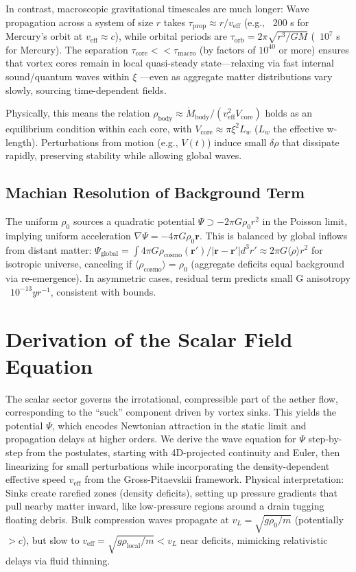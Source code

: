 \documentclass{article}
\begin{document}
In contrast, macroscopic gravitational timescales are much longer: Wave propagation across a system of size $r$ takes $\tau_{\text{prop}} \approx r / v_{\text{eff}}$ (e.g., ~200 s for Mercury's orbit at $v_{\text{eff}} \approx c$), while orbital periods are $\tau_{\text{orb}} = 2\pi \sqrt{r^3 / G M}$ (~$10^{7}$ s for Mercury). The separation $\tau_{\text{core}} << \tau_{\text{macro}}$ (by factors of $10^{40}$ or more) ensures that vortex cores remain in local quasi-steady state---relaxing via fast internal sound/quantum waves within $\xi$ ---even as aggregate matter distributions vary slowly, sourcing time-dependent fields.

Physically, this means the relation $\rho_{\text{body}} \approx \dot{M}_{\text{body}} / (v_{\text{eff}}^2 V_{\text{core}})$ holds as an equilibrium condition within each core, with $V_{\text{core}} \approx \pi \xi^2 L_w$ ($L_w$ the effective w-length). Perturbations from motion (e.g., $V(t)$) induce small $\delta \rho$ that dissipate rapidly, preserving stability while allowing global waves.

\subsection{Machian Resolution of Background Term}

The uniform $\rho_0$ sources a quadratic potential $\Psi \supset -2\pi G \rho_0 r^2$ in the Poisson limit, implying uniform acceleration $\nabla \Psi = -4\pi G \rho_0 \mathbf{r}$. This is balanced by global inflows from distant matter: $\Psi_{\text{global}} = \int 4\pi G \rho_{\text{cosmo}}(\mathbf{r}') / |\mathbf{r} - \mathbf{r}'| d^3 r' \approx 2\pi G \langle \rho \rangle r^2$ for isotropic universe, canceling if $\langle \rho_{\text{cosmo}} \rangle = \rho_0$ (aggregate deficits equal background via re-emergence). In asymmetric cases, residual term predicts small G anisotropy ~$10^{-13} yr^{-1}$, consistent with bounds.

\section{Derivation of the Scalar Field Equation}

The scalar sector governs the irrotational, compressible part of the aether flow, corresponding to the ``suck'' component driven by vortex sinks. This yields the potential $\Psi$, which encodes Newtonian attraction in the static limit and propagation delays at higher orders. We derive the wave equation for $\Psi$ step-by-step from the postulates, starting with 4D-projected continuity and Euler, then linearizing for small perturbations while incorporating the density-dependent effective speed $v_{\text{eff}}$ from the Gross-Pitaevskii framework. Physical interpretation: Sinks create rarefied zones (density deficits), setting up pressure gradients that pull nearby matter inward, like low-pressure regions around a drain tugging floating debris. Bulk compression waves propagate at $v_L = \sqrt{g \rho_0 / m}$ (potentially $> c$), but slow to $v_{\text{eff}} = \sqrt{g \rho_{\text{local}} / m} < v_L$ near deficits, mimicking relativistic delays via fluid thinning.
\end{document}
